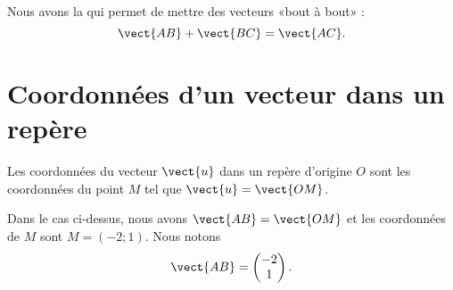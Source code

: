\begin{Aretenir}
    \begin{multicols}{2}
    Nous avons la  qui permet de mettre des vecteurs «bout à bout» :
    \begin{equation}
        \vect{ AB }+\vect{ BC }=\vect{ AC }.
    \end{equation}

    \columnbreak



    \end{multicols}
\end{Aretenir}

\section{Coordonnées d'un vecteur dans un repère}

\begin{multicols}{2}
    \begin{definition}
        Les coordonnées du vecteur \( \vect{ u }\) dans un repère d'origine \( O\) sont les coordonnées du point \( M\) tel que \( \vect{ u }=\vect{ OM }\).
    \end{definition}

    \columnbreak

    \begin{center}

    \end{center}
\end{multicols}
Dans le cas ci-dessus, nous avons \( \vect{ AB }=\vect{ OM }\) et les coordonnées de \( M\) sont \( M=(-2;1)\). Nous notons
\begin{equation}
    \vect{ AB }=\begin{pmatrix}
        -2    \\ 
        1    
    \end{pmatrix}.
\end{equation}

